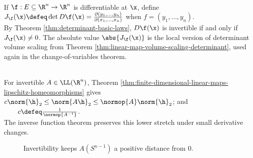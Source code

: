 \begin{definition} \label{def:jacobian-determinant} \\
If $\f:E\subseteq\R^n\to\R^n$ is differentiable at $\x$, define $J_{\f}(\x)\defeq \det D\f(\x) =\frac{\partial(y_1,\ldots,y_n)}{\partial(x_1,\ldots,x_n)}$ when $f=(y_1,\ldots,y_n)$.\\
By Theorem \ref{thm:determinant-basic-laws}, $D\f(\x)$ is invertible if and only if $J_{\f}(\x)\neq0$. The absolute value $\abs{J_{\f}(\x)}$ is the local version of determinant volume scaling from Theorem \ref{thm:linear-map-volume-scaling-determinant}, used again in the change-of-variables theorem.
\end{definition}

\begin{perspective} \label{per:linear-inverse-lower-bound} \\
For invertible $A\in\LL(\R^n)$, Theorem \ref{thm:finite-dimensional-linear-maps-lipschitz-homeomorphisms} gives $c\norm{\h}_2\leq\norm{A\h}_2\leq\normop{A}\norm{\h}_2$; and $\qquad c\defeq\frac{1}{\normop{A^{-1}}}$.\\
The inverse function theorem preserves this lower stretch under small derivative changes.
\end{perspective}

\begin{figure}[H]
  \centering
  
  \caption{Invertibility keeps $A(S^{n-1})$ a positive distance from $0$.}
  \label{fig:linear-isomorphism-conorm}
\end{figure}

